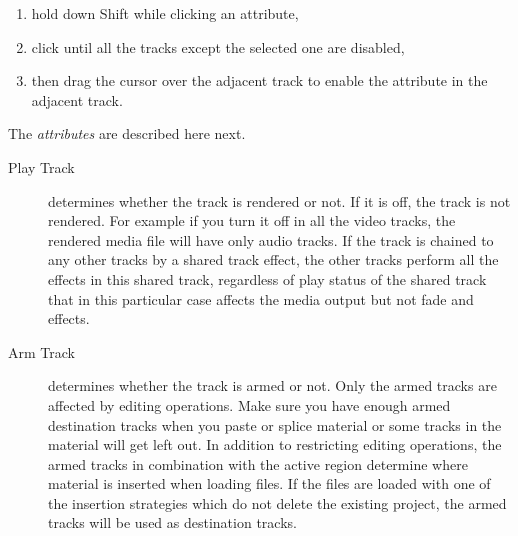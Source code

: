 \begin{enumerate}
\item hold down Shift while clicking an attribute,
\item click until all the tracks except the selected one are
  disabled,
\item then drag the cursor over the adjacent track to enable the
  attribute in the adjacent track.
\end{enumerate}

The \textit{attributes} are described here next.

\begin{description}
\item[Play Track] determines whether the track is rendered or
  not. If it is off, the track is not rendered.  For example if you
  turn it off in all the video tracks, the rendered media file will
  have only audio tracks.  If the track is chained to any other tracks
  by a shared track effect, the other tracks perform all the effects
  in this shared track, regardless of play status of the shared track
  that in this particular case affects the media output but not fade
  and effects.
\item[Arm Track] determines whether the track is armed or not.
  Only the armed tracks are affected by editing operations. Make sure
  you have enough armed destination tracks when you paste or splice
  material or some tracks in the material will get left out.  In
  addition to restricting editing operations, the armed tracks in
  combination with the active region determine where material is
  inserted when loading files.  If the files are loaded with one of
  the insertion strategies which do not delete the existing project,
  the armed tracks will be used as destination tracks.
\end{description}

